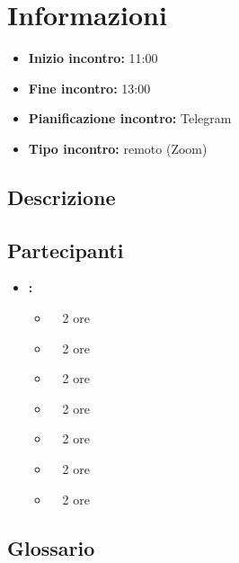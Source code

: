 \section{Informazioni}
\begin{itemize}
	\item \textbf{Inizio incontro:} 11:00
	\item \textbf{Fine incontro:} 13:00
	\item \textbf{Pianificazione incontro:} Telegram
	\item \textbf{Tipo incontro:} remoto (Zoom)
\end{itemize}

\subsection{Descrizione}
\DocDescription

\subsection{Partecipanti}

\begin{itemize}
	\item \textbf{\GroupName:}
	\begin{itemize}
		\item \tommaso \ \rightarrow\ 2 ore
		\item \marco \ \rightarrow\ 2 ore
		\item \riccardo \ \rightarrow\ 2 ore
		\item \raul \ \rightarrow\ 2 ore
		\item \martina \ \rightarrow\ 2 ore
		\item \sebastiano \ \rightarrow\ 2 ore
		\item \mattia \ \rightarrow\ 2 ore
	\end{itemize}
\end{itemize}

\subsection{Glossario}
\GlossarioIntroduzione

\clearpage